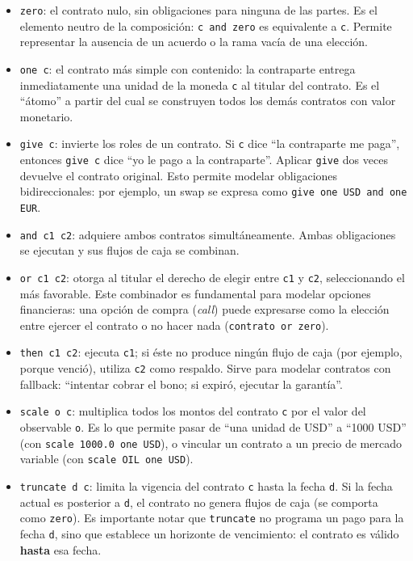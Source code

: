 \documentclass[a4paper, 12pt]{article}
\begin{document}
\begin{itemize}
    \item \texttt{zero}: el contrato nulo, sin obligaciones para ninguna de las partes. Es el elemento neutro de la composición: \texttt{c and zero} es equivalente a \texttt{c}. Permite representar la ausencia de un acuerdo o la rama vacía de una elección.

    \item \texttt{one c}: el contrato más simple con contenido: la contraparte entrega inmediatamente una unidad de la moneda \texttt{c} al titular del contrato. Es el ``átomo'' a partir del cual se construyen todos los demás contratos con valor monetario.

    \item \texttt{give c}: invierte los roles de un contrato. Si \texttt{c} dice ``la contraparte me paga'', entonces \texttt{give c} dice ``yo le pago a la contraparte''. Aplicar \texttt{give} dos veces devuelve el contrato original. Esto permite modelar obligaciones bidireccionales: por ejemplo, un swap se expresa como \texttt{give one USD and one EUR}.

    \item \texttt{and c1 c2}: adquiere ambos contratos simultáneamente. Ambas obligaciones se ejecutan y sus flujos de caja se combinan.

    \item \texttt{or c1 c2}: otorga al titular el derecho de elegir entre \texttt{c1} y \texttt{c2}, seleccionando el más favorable. Este combinador es fundamental para modelar opciones financieras: una opción de compra (\textit{call}) puede expresarse como la elección entre ejercer el contrato o no hacer nada (\texttt{contrato or zero}).

    \item \texttt{then c1 c2}: ejecuta \texttt{c1}; si éste no produce ningún flujo de caja (por ejemplo, porque venció), utiliza \texttt{c2} como respaldo. Sirve para modelar contratos con fallback: ``intentar cobrar el bono; si expiró, ejecutar la garantía''.

    \item \texttt{scale o c}: multiplica todos los montos del contrato \texttt{c} por el valor del observable \texttt{o}. Es lo que permite pasar de ``una unidad de USD'' a ``1000 USD'' (con \texttt{scale 1000.0 one USD}), o vincular un contrato a un precio de mercado variable (con \texttt{scale OIL one USD}).

    \item \texttt{truncate d c}: limita la vigencia del contrato \texttt{c} hasta la fecha \texttt{d}. Si la fecha actual es posterior a \texttt{d}, el contrato no genera flujos de caja (se comporta como \texttt{zero}). Es importante notar que \texttt{truncate} no programa un pago para la fecha \texttt{d}, sino que establece un horizonte de vencimiento: el contrato es válido \textbf{hasta} esa fecha.
\end{itemize}
\end{document}
